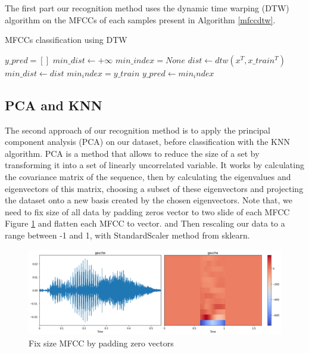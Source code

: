 \documentclass[%
  article,%
  10pt,%
  a4paper,%
  fleqn,%
  oneside,%
  sumario = tradicional,%
  chapter = TITLE,%
  section = TITLE,%
]{abntex2}
\begin{document}
The first part our recognition method uses the dynamic time warping (DTW) algorithm on the MFCCs of each samples present in Algorithm \ref{mfccdtw}.

\begin{algorithm}
  \caption{MFCCs classification using DTW}\label{mfccdtw}
  \begin{algorithmic}
    \State $y\_pred = []$
    	\State $min\_dist \gets +\infty$
	\State $min\_index = None$
   		 \State $dist \gets dtw(x^T, x\_train^T)$
    			\State $min\_dist \gets dist$
			\State $min_index = y\_train$
    		\EndIf
    	\EndFor
	\State $y\_pred \gets min_index$
    \EndFor
  \end{algorithmic}
\end{algorithm}

\subsection{PCA and KNN}
The second approach of our recognition method is to apply the principal component analysis (PCA) on our dataset, before classification with the KNN algorithm. PCA is a method that allows to reduce the size of a set by transforming it into a set of linearly uncorrelated variable. It works by calculating the covariance matrix of the sequence, then by calculating the eigenvalues and eigenvectors of this matrix, choosing a subset of these eigenvectors and projecting the dataset onto a new basis created by the chosen eigenvectors. Note that, we need to fix size of all data by padding zeros vector to two slide of each MFCC Figure \ref{fig:mfccpadding} and flatten each MFCC to vector. and Then rescaling our data to a range between -1 and 1, with StandardScaler method from sklearn. 

\begin{figure}[H]
  \centering
  \includegraphics[width = 0.8\columnwidth]{./Figuras/mfccpadding}
  \caption{Fix size MFCC by padding zero vectors}
  \label{fig:mfccpadding}
\end{figure}
\end{document}
